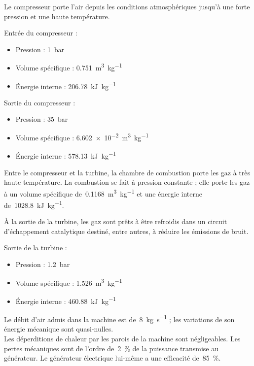 	Le compresseur porte l’air depuis les conditions atmosphériques jusqu’à une forte pression et une haute température.
	
	Entrée du compresseur :		
	\begin{itemize}
		\item Pression : 				\tab \SI{1}{\bar}
		\item Volume spécifique : 	\tab \SI{0,751}{\metre\cubed\per\kilogram}
		\item Énergie interne : 	\tab \SI{206,78}{\kilo\joule\per\kilogram}
	\end{itemize}

	Sortie du compresseur :		
	\begin{itemize}
		\item Pression : 				\tab \SI{35}{\bar}
		\item Volume spécifique : 	\tab \SI{6,602e-2}{\metre\cubed\per\kilogram}
		\item Énergie interne : 	\tab \SI{578,13}{\kilo\joule\per\kilogram}
	\end{itemize}

	Entre le compresseur et la turbine, la chambre de combustion porte les gaz à très haute température. La combustion se fait à pression constante ; elle porte les gaz à un volume spécifique de~\SI{0,1168}{\metre\cubed\per\kilogram} et une énergie interne de~\SI{1028,8}{\kilo\joule\per\kilogram}. 
	
	À la sortie de la turbine, les gaz sont prêts à être refroidis dans un circuit d’échappement catalytique destiné, entre autres, à réduire les émissions de bruit.
	
	Sortie de la turbine :		
	\begin{itemize}
		\item Pression : 				\tab \SI{1,2}{\bar}
		\item Volume spécifique : 	\tab \SI{1,526}{\metre\cubed\per\kilogram}
		\item Énergie interne : 	\tab \SI{460,88}{\kilo\joule\per\kilogram}
	\end{itemize}

	Le débit d’air admis dans la machine est de~\SI{8}{\kilogram\per\second} ; les variations de son énergie mécanique sont quasi-nulles.\\
	Les déperditions de chaleur par les parois de la machine sont négligeables. Les pertes mécaniques sont de l’ordre de~\SI{2}{\percent} de la puissance transmise au générateur. Le générateur électrique lui-même a une efficacité de~\SI{85}{\percent}.

